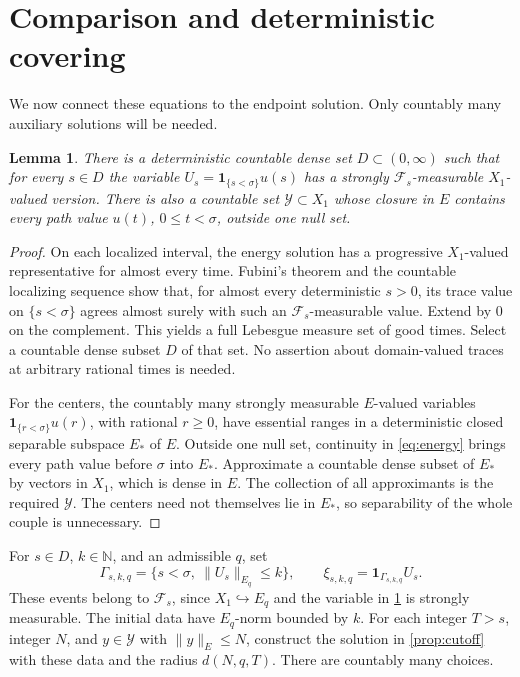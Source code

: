 \documentclass[11pt]{amsart}
\newtheorem{lemma}[theorem]{Lemma}
\theoremstyle{definition}
\theoremstyle{remark}
\newcommand{\N}{\mathbb N}
\newcommand{\ind}{\mathbf 1}
\newcommand{\norm}[2][]{\lVert #2\rVert_{#1}}
\numberwithin{equation}{section}
\begin{document}
\section{Comparison and deterministic covering}

We now connect these equations to the endpoint solution. Only countably
many auxiliary solutions will be needed.

\begin{lemma}\label{lem:restarts}
There is a deterministic countable dense set $D\subset(0,\infty)$ such
that for every $s\in D$ the variable
$U_s=\ind_{\{s<\sigma\}}u(s)$ has a strongly $\mathcal F_s$-measurable
$X_1$-valued version. There is also a countable set
$\mathcal Y\subset X_1$ whose closure in $E$ contains every path
value $u(t)$, $0\le t<\sigma$, outside one null set.
\end{lemma}

\begin{proof}
On each localized interval, the energy solution has a progressive
$X_1$-valued representative for almost every time. Fubini's theorem
and the countable localizing sequence show that, for almost every
deterministic $s>0$, its trace value on $\{s<\sigma\}$ agrees almost
surely with such an $\mathcal F_s$-measurable value. Extend by $0$
on the complement. This yields a full Lebesgue measure set of good
times. Select a countable dense subset $D$ of that set. No assertion
about domain-valued traces at arbitrary rational times is needed.

For the centers, the countably many strongly measurable $E$-valued
variables $\ind_{\{r<\sigma\}}u(r)$, with rational $r\ge0$, have
essential ranges in a deterministic closed separable subspace $E_*$
of $E$. Outside one null set, continuity in \eqref{eq:energy} brings
every path value before $\sigma$ into $E_*$. Approximate a countable
dense subset of $E_*$ by vectors in $X_1$, which is dense in $E$.
The collection of all approximants is the required $\mathcal Y$.
The centers need not themselves lie in $E_*$, so separability of the
whole couple is unnecessary.
\end{proof}

For $s\in D$, $k\in\N$, and an admissible $q$, set
\begin{equation}\label{eq:restartdata}
 \Gamma_{s,k,q}=\{s<\sigma,\ \norm[E_q]{U_s}\le k\},
 \qquad \xi_{s,k,q}=\ind_{\Gamma_{s,k,q}}U_s.
\end{equation}
These events belong to $\mathcal F_s$, since $X_1\hookrightarrow E_q$
and the variable in \cref{lem:restarts} is strongly measurable.
The initial data have $E_q$-norm bounded by $k$.
For each integer $T>s$, integer $N$, and
$y\in\mathcal Y$ with $\norm[E]{y}\le N$, construct the solution in
\cref{prop:cutoff} with these data and the radius $d(N,q,T)$.
There are countably many choices.
\end{document}
